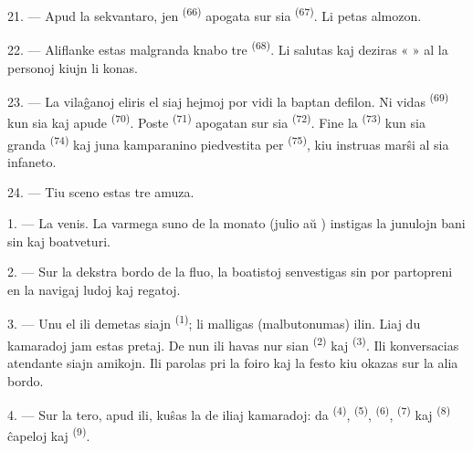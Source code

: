 \VUsaut{4.6mm}
\VUsaut{3.4mm}

21. --- Apud la sekvantaro, jen  \textsuperscript{(66)}
apogata sur sia  \textsuperscript{(67)}. Li petas almozon.

22. --- Aliflanke estas malgranda knabo tre 
\textsuperscript{(68)}. Li salutas kaj deziras «  » al la
personoj kiujn li konas.

23. --- La vilaĝanoj eliris el siaj hejmoj por vidi la baptan defilon. Ni
vidas  \textsuperscript{(69)} kun sia  kaj apude  \textsuperscript{(70)}. Poste
 \textsuperscript{(71)} apogatan sur sia 
\textsuperscript{(72)}. Fine la  \textsuperscript{(73)} kun
sia granda  \textsuperscript{(74)} kaj juna kamparanino
piedvestita per  \textsuperscript{(75)}, kiu instruas
marŝi al sia infaneto.

24. --- Tiu sceno estas tre amuza.
\VUsaut{4.0mm}

\VUsaut{3.0mm}

\VUsaut{2.4mm}

\VUsaut{3.0mm}

1. --- La  venis. La varmega suno de la monato 
(julio aŭ ) instigas la junulojn bani sin kaj boatveturi.

2. --- Sur la dekstra bordo de la fluo, la boatistoj senvestigas sin por
partopreni en la navigaj ludoj kaj regatoj.

3. --- Unu el ili demetas siajn  \textsuperscript{(1)}; li
malligas (malbutonumas) ilin. Liaj du kamaradoj jam estas pretaj. De nun ili
havas nur sian  \textsuperscript{(2)} kaj
 \textsuperscript{(3)}. Ili konversacias atendante
siajn amikojn. Ili parolas pri la foiro kaj la festo kiu okazas sur la alia
bordo.

4. --- Sur la tero, apud ili, kuŝas la  de iliaj kamaradoj:
 da  \textsuperscript{(4)}, 
\textsuperscript{(5)},  \textsuperscript{(6)},
 \textsuperscript{(7)} kaj  \textsuperscript{(8)}
ĉapeloj kaj  \textsuperscript{(9)}.

